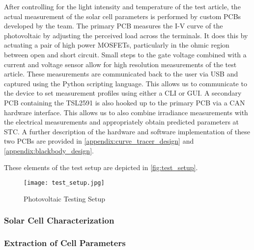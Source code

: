 After controlling for the light intensity and temperature of the test article,
the actual measurement of the solar cell parameters is performed by custom
\acp{PCB} developed by the team. The primary \ac{PCB} measures the \ac{I-V}
curve of the photovoltaic by adjusting the perceived load across the terminals.
It does this by actuating a pair of high power \acfp{MOSFET}, particularly in
the ohmic region between open and short circuit. Small steps to the gate voltage
combined with a current and voltage sensor allow for high resolution
measurements of the test article. These measurements are communicated back to
the user via \ac{USB} and captured using the Python scripting language. This
allows us to communicate to the device to set measurement profiles using either
a \ac{CLI} or \ac{GUI}. A secondary \ac{PCB} containing the TSL2591 is also
hooked up to the primary \ac{PCB} via a \ac{CAN} hardware interface. This
allows us to also combine irradiance measurements with the electrical
measurements and appropriately obtain predicted parameters at \ac{STC}. A
further description of the hardware and software implementation of these two
\acp{PCB} are provided in \autoref{appendix:curve_tracer_design} and
\autoref{appendix:blackbody_design}.

These elements of the test setup are depicted in \autoref{fig:test_setup}.

\begin{figure}[!htbp]
    \centering
    \texttt{[image: test\_setup.jpg]}
    \caption{Photovoltaic Testing Setup}
    \label{fig:test_setup}
\end{figure}


\subsubsection{Solar Cell Characterization}\label{subsubsec:solar_cell_characterization}



\subsubsection{Extraction of Cell Parameters}\label{subsubsec:extraction_of_cell_parameters}



